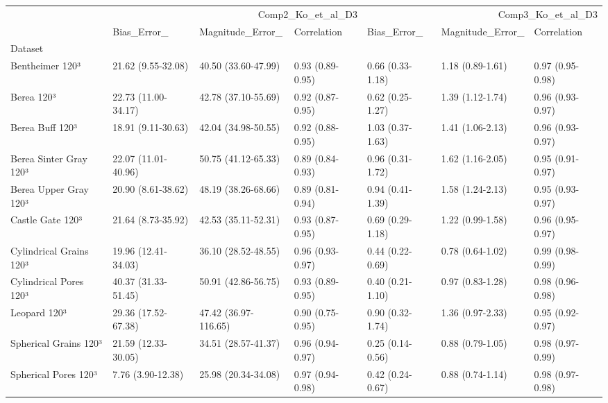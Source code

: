 \begin{tabular}{lllllll}
\toprule
 & \multicolumn{3}{r}{Comp2_Ko_et_al_D3} & \multicolumn{3}{r}{Comp3_Ko_et_al_D3} \\
 & Bias_Error_ & Magnitude_Error_ & Correlation & Bias_Error_ & Magnitude_Error_ & Correlation \\
Dataset &  &  &  &  &  &  \\
\midrule
Bentheimer 120³ & 21.62 (9.55-32.08) & 40.50 (33.60-47.99) & 0.93 (0.89-0.95) & 0.66 (0.33-1.18) & 1.18 (0.89-1.61) & 0.97 (0.95-0.98) \\
Berea 120³ & 22.73 (11.00-34.17) & 42.78 (37.10-55.69) & 0.92 (0.87-0.95) & 0.62 (0.25-1.27) & 1.39 (1.12-1.74) & 0.96 (0.93-0.97) \\
Berea Buff 120³ & 18.91 (9.11-30.63) & 42.04 (34.98-50.55) & 0.92 (0.88-0.95) & 1.03 (0.37-1.63) & 1.41 (1.06-2.13) & 0.96 (0.93-0.97) \\
Berea Sinter Gray 120³ & 22.07 (11.01-40.96) & 50.75 (41.12-65.33) & 0.89 (0.84-0.93) & 0.96 (0.31-1.72) & 1.62 (1.16-2.05) & 0.95 (0.91-0.97) \\
Berea Upper Gray 120³ & 20.90 (8.61-38.62) & 48.19 (38.26-68.66) & 0.89 (0.81-0.94) & 0.94 (0.41-1.39) & 1.58 (1.24-2.13) & 0.95 (0.93-0.97) \\
Castle Gate 120³ & 21.64 (8.73-35.92) & 42.53 (35.11-52.31) & 0.93 (0.87-0.95) & 0.69 (0.29-1.18) & 1.22 (0.99-1.58) & 0.96 (0.95-0.97) \\
Cylindrical Grains 120³ & 19.96 (12.41-34.03) & 36.10 (28.52-48.55) & 0.96 (0.93-0.97) & 0.44 (0.22-0.69) & 0.78 (0.64-1.02) & 0.99 (0.98-0.99) \\
Cylindrical Pores 120³ & 40.37 (31.33-51.45) & 50.91 (42.86-56.75) & 0.93 (0.89-0.95) & 0.40 (0.21-1.10) & 0.97 (0.83-1.28) & 0.98 (0.96-0.98) \\
Leopard 120³ & 29.36 (17.52-67.38) & 47.42 (36.97-116.65) & 0.90 (0.75-0.95) & 0.90 (0.32-1.74) & 1.36 (0.97-2.33) & 0.95 (0.92-0.97) \\
Spherical Grains 120³ & 21.59 (12.33-30.05) & 34.51 (28.57-41.37) & 0.96 (0.94-0.97) & 0.25 (0.14-0.56) & 0.88 (0.79-1.05) & 0.98 (0.97-0.99) \\
Spherical Pores 120³ & 7.76 (3.90-12.38) & 25.98 (20.34-34.08) & 0.97 (0.94-0.98) & 0.42 (0.24-0.67) & 0.88 (0.74-1.14) & 0.98 (0.97-0.98) \\
\bottomrule
\end{tabular}
